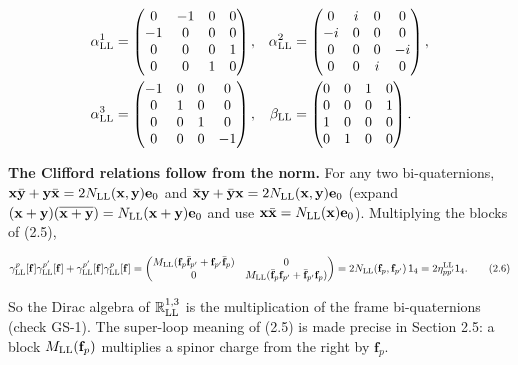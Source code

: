 \documentclass[
  10pt,
]{article}
\begin{document}
\[\begin{aligned}\alpha^1_{\rm LL}&=\begin{pmatrix}0&-1&0&0\\-1&0&0&0\\0&0&0&1\\0&0&1&0\end{pmatrix},&\alpha^2_{\rm LL}&=\begin{pmatrix}0&i&0&0\\-i&0&0&0\\0&0&0&-i\\0&0&i&0\end{pmatrix},\\ \alpha^3_{\rm LL}&=\begin{pmatrix}-1&0&0&0\\0&1&0&0\\0&0&1&0\\0&0&0&-1\end{pmatrix},&\beta_{\rm LL}&=\begin{pmatrix}0&0&1&0\\0&0&0&1\\1&0&0&0\\0&1&0&0\end{pmatrix}.\end{aligned}\]

\textbf{The Clifford relations follow from the norm.} For any two
bi-quaternions,
\(\mathbf x\bar{\mathbf y}+\mathbf y\bar{\mathbf x}=2N_{\rm LL}(\mathbf x,\mathbf y)\mathbf e_0\)
and
\(\bar{\mathbf x}\mathbf y+\bar{\mathbf y}\mathbf x=2N_{\rm LL}(\mathbf x,\mathbf y)\mathbf e_0\)
(expand
\((\mathbf x+\mathbf y)(\overline{\mathbf x+\mathbf y})=N_{\rm LL}(\mathbf x+\mathbf y)\mathbf e_0\)
and use \(\mathbf x\bar{\mathbf x}=N_{\rm LL}(\mathbf x)\mathbf e_0\)).
Multiplying the blocks of (2.5),

\[\gamma^p_{\rm LL}[\mathbf f]\gamma^{p'}_{\rm LL}[\mathbf f]+\gamma^{p'}_{\rm LL}[\mathbf f]\gamma^p_{\rm LL}[\mathbf f]=\begin{pmatrix}M_{\rm LL}(\mathbf f_p\bar{\mathbf f}_{p'}+\mathbf f_{p'}\bar{\mathbf f}_p)&0\\0&M_{\rm LL}(\bar{\mathbf f}_p\mathbf f_{p'}+\bar{\mathbf f}_{p'}\mathbf f_p)\end{pmatrix}=2N_{\rm LL}(\mathbf f_p,\mathbf f_{p'})\,\mathsf 1_4=2\eta^{\rm LL}_{pp'}\mathsf 1_4.\tag{2.6}\]

So the Dirac algebra of \(\mathbb R^{1,3}_{\rm LL}\) is the
multiplication of the frame bi-quaternions (check GS-1). The super-loop
meaning of (2.5) is made precise in Section 2.5: a block
\(M_{\rm LL}(\mathbf f_p)\) multiplies a spinor charge from the right by
\(\mathbf f_p\).
\end{document}
